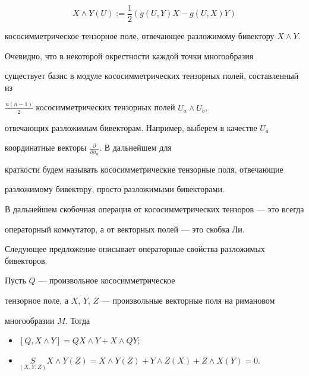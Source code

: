 \begin{equation}


X\land Y(U):=\frac{1}{2}(g(U,Y)X-g(U,X)Y)


\end{equation}


кососимметрическое тензорное поле, отвечающее разложимому бивектору $X\land Y$.


Очевидно, что в некоторой окрестности каждой точки многообразия


существует базис в модуле кососимметрических тензорных полей, составленный из


$\frac{n(n-1)}{2}$ кососимметрических тензорных полей $U_a\land U_b$,


отвечающих разложимым бивекторам. Например, выберем в качестве $U_a$


координатные векторы $\frac{\partial}{\partial u_a}$. В дальнейшем для


краткости будем называть кососимметрические тензорные поля, отвечающие


разложимому бивектору, просто разложимыми бивекторами.


В дальнейшем скобочная операция от кососимметрических тензоров --- это всегда


операторный коммутатор, а от векторных полей --- это скобка Ли.


Следующее предложение описывает операторные свойства разложимых бивекторов.





\begin{props} Пусть $Q$ --- произвольное кососимметрическое


тензорное поле, а $X$, $Y$, $Z$ --- произвольные векторные поля на римановом


многообразии $M$. Тогда


\begin{itemize}


\item[а)] $[Q,X\land Y]=QX\land Y+X\land {QY};$


\item[б)] $\underset{(X,Y,Z)}{S}{}X\land Y(Z)=X\land Y(Z)+


Y\land Z(X)+Z\land X(Y)=0.$


\end{itemize}


\end{props}





